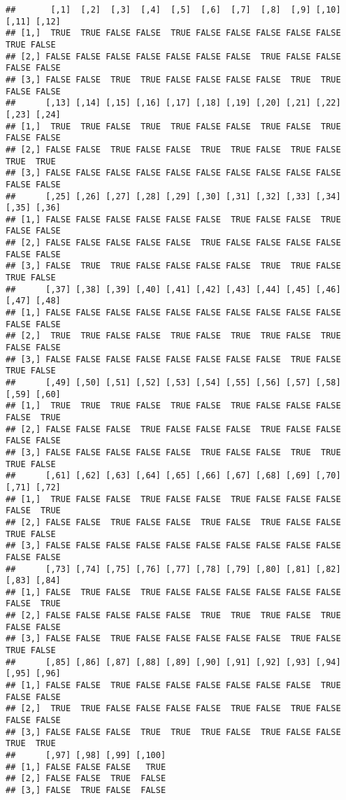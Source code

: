 \documentclass[
]{article}
\begin{document}
\begin{verbatim}
##       [,1]  [,2]  [,3]  [,4]  [,5]  [,6]  [,7]  [,8]  [,9] [,10] [,11] [,12]
## [1,]  TRUE  TRUE FALSE FALSE  TRUE FALSE FALSE FALSE FALSE FALSE  TRUE FALSE
## [2,] FALSE FALSE FALSE FALSE FALSE FALSE FALSE  TRUE FALSE FALSE FALSE FALSE
## [3,] FALSE FALSE  TRUE  TRUE FALSE FALSE FALSE FALSE  TRUE  TRUE FALSE FALSE
##      [,13] [,14] [,15] [,16] [,17] [,18] [,19] [,20] [,21] [,22] [,23] [,24]
## [1,]  TRUE  TRUE FALSE  TRUE  TRUE FALSE FALSE  TRUE FALSE  TRUE FALSE FALSE
## [2,] FALSE FALSE  TRUE FALSE FALSE  TRUE  TRUE FALSE  TRUE FALSE  TRUE  TRUE
## [3,] FALSE FALSE FALSE FALSE FALSE FALSE FALSE FALSE FALSE FALSE FALSE FALSE
##      [,25] [,26] [,27] [,28] [,29] [,30] [,31] [,32] [,33] [,34] [,35] [,36]
## [1,] FALSE FALSE FALSE FALSE FALSE FALSE  TRUE FALSE FALSE  TRUE FALSE FALSE
## [2,] FALSE FALSE FALSE FALSE FALSE  TRUE FALSE FALSE FALSE FALSE FALSE FALSE
## [3,] FALSE  TRUE  TRUE FALSE FALSE FALSE FALSE  TRUE  TRUE FALSE  TRUE FALSE
##      [,37] [,38] [,39] [,40] [,41] [,42] [,43] [,44] [,45] [,46] [,47] [,48]
## [1,] FALSE FALSE FALSE FALSE FALSE FALSE FALSE FALSE FALSE FALSE FALSE FALSE
## [2,]  TRUE  TRUE FALSE FALSE  TRUE FALSE  TRUE  TRUE FALSE  TRUE FALSE FALSE
## [3,] FALSE FALSE FALSE FALSE FALSE FALSE FALSE FALSE  TRUE FALSE  TRUE FALSE
##      [,49] [,50] [,51] [,52] [,53] [,54] [,55] [,56] [,57] [,58] [,59] [,60]
## [1,]  TRUE  TRUE  TRUE FALSE  TRUE FALSE  TRUE FALSE FALSE FALSE FALSE  TRUE
## [2,] FALSE FALSE FALSE  TRUE FALSE FALSE FALSE  TRUE FALSE FALSE FALSE FALSE
## [3,] FALSE FALSE FALSE FALSE FALSE  TRUE FALSE FALSE  TRUE  TRUE  TRUE FALSE
##      [,61] [,62] [,63] [,64] [,65] [,66] [,67] [,68] [,69] [,70] [,71] [,72]
## [1,]  TRUE FALSE FALSE  TRUE FALSE FALSE  TRUE FALSE FALSE FALSE FALSE  TRUE
## [2,] FALSE FALSE  TRUE FALSE FALSE  TRUE FALSE  TRUE FALSE FALSE  TRUE FALSE
## [3,] FALSE FALSE FALSE FALSE FALSE FALSE FALSE FALSE FALSE FALSE FALSE FALSE
##      [,73] [,74] [,75] [,76] [,77] [,78] [,79] [,80] [,81] [,82] [,83] [,84]
## [1,] FALSE  TRUE FALSE  TRUE FALSE FALSE FALSE FALSE FALSE FALSE FALSE  TRUE
## [2,] FALSE FALSE FALSE FALSE FALSE  TRUE  TRUE  TRUE FALSE  TRUE FALSE FALSE
## [3,] FALSE FALSE  TRUE FALSE FALSE FALSE FALSE FALSE  TRUE FALSE  TRUE FALSE
##      [,85] [,86] [,87] [,88] [,89] [,90] [,91] [,92] [,93] [,94] [,95] [,96]
## [1,] FALSE FALSE  TRUE FALSE FALSE FALSE FALSE FALSE FALSE  TRUE FALSE FALSE
## [2,]  TRUE  TRUE FALSE FALSE FALSE FALSE  TRUE FALSE  TRUE FALSE FALSE FALSE
## [3,] FALSE FALSE FALSE  TRUE  TRUE  TRUE FALSE  TRUE FALSE FALSE  TRUE  TRUE
##      [,97] [,98] [,99] [,100]
## [1,] FALSE FALSE FALSE   TRUE
## [2,] FALSE FALSE  TRUE  FALSE
## [3,] FALSE  TRUE FALSE  FALSE
\end{verbatim}
\end{document}
